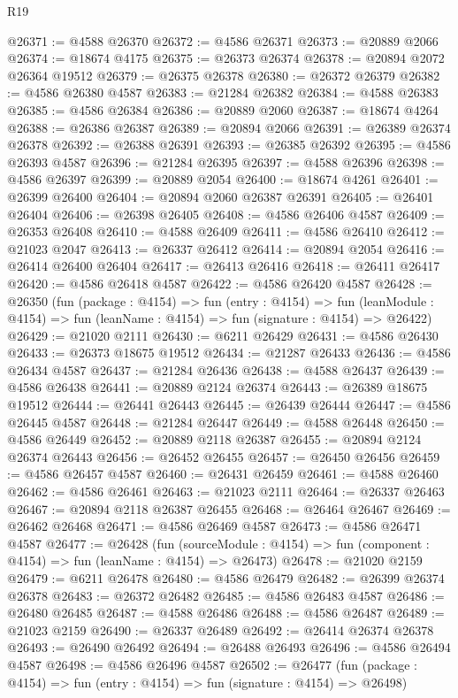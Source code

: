 \begin{lexlean}{R19}
\begin{coremodule}
@26371 := @4588 @26370
@26372 := @4586 @26371
@26373 := @20889 @2066
@26374 := @18674 @4175
@26375 := @26373 @26374
@26378 := @20894 @2072 @26364 @19512
@26379 := @26375 @26378
@26380 := @26372 @26379
@26382 := @4586 @26380 @4587
@26383 := @21284 @26382
@26384 := @4588 @26383
@26385 := @4586 @26384
@26386 := @20889 @2060
@26387 := @18674 @4264
@26388 := @26386 @26387
@26389 := @20894 @2066
@26391 := @26389 @26374 @26378
@26392 := @26388 @26391
@26393 := @26385 @26392
@26395 := @4586 @26393 @4587
@26396 := @21284 @26395
@26397 := @4588 @26396
@26398 := @4586 @26397
@26399 := @20889 @2054
@26400 := @18674 @4261
@26401 := @26399 @26400
@26404 := @20894 @2060 @26387 @26391
@26405 := @26401 @26404
@26406 := @26398 @26405
@26408 := @4586 @26406 @4587
@26409 := @26353 @26408
@26410 := @4588 @26409
@26411 := @4586 @26410
@26412 := @21023 @2047
@26413 := @26337 @26412
@26414 := @20894 @2054
@26416 := @26414 @26400 @26404
@26417 := @26413 @26416
@26418 := @26411 @26417
@26420 := @4586 @26418 @4587
@26422 := @4586 @26420 @4587
@26428 := @26350
    (fun (package : @4154) =>
    fun (entry : @4154) =>
    fun (leanModule : @4154) => fun (leanName : @4154) => fun (signature : @4154) => @26422)
@26429 := @21020 @2111
@26430 := @6211 @26429
@26431 := @4586 @26430
@26433 := @26373 @18675 @19512
@26434 := @21287 @26433
@26436 := @4586 @26434 @4587
@26437 := @21284 @26436
@26438 := @4588 @26437
@26439 := @4586 @26438
@26441 := @20889 @2124 @26374
@26443 := @26389 @18675 @19512
@26444 := @26441 @26443
@26445 := @26439 @26444
@26447 := @4586 @26445 @4587
@26448 := @21284 @26447
@26449 := @4588 @26448
@26450 := @4586 @26449
@26452 := @20889 @2118 @26387
@26455 := @20894 @2124 @26374 @26443
@26456 := @26452 @26455
@26457 := @26450 @26456
@26459 := @4586 @26457 @4587
@26460 := @26431 @26459
@26461 := @4588 @26460
@26462 := @4586 @26461
@26463 := @21023 @2111
@26464 := @26337 @26463
@26467 := @20894 @2118 @26387 @26455
@26468 := @26464 @26467
@26469 := @26462 @26468
@26471 := @4586 @26469 @4587
@26473 := @4586 @26471 @4587
@26477 := @26428
    (fun (sourceModule : @4154) => fun (component : @4154) => fun (leanName : @4154) => @26473)
@26478 := @21020 @2159
@26479 := @6211 @26478
@26480 := @4586 @26479
@26482 := @26399 @26374 @26378
@26483 := @26372 @26482
@26485 := @4586 @26483 @4587
@26486 := @26480 @26485
@26487 := @4588 @26486
@26488 := @4586 @26487
@26489 := @21023 @2159
@26490 := @26337 @26489
@26492 := @26414 @26374 @26378
@26493 := @26490 @26492
@26494 := @26488 @26493
@26496 := @4586 @26494 @4587
@26498 := @4586 @26496 @4587
@26502 := @26477 (fun (package : @4154) => fun (entry : @4154) => fun (signature : @4154) => @26498)

\end{coremodule}
\end{lexlean}
